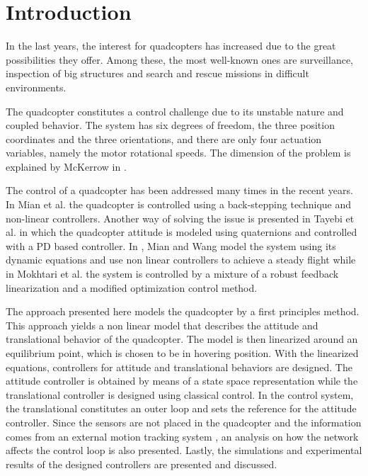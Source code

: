 \section{Introduction}
In the last years, the interest for quadcopters has increased due to the great possibilities they offer. Among these, the most well-known ones are surveillance, inspection of big structures and search and rescue missions in difficult environments. \cite{droneuses}

The quadcopter constitutes a control challenge due to its unstable nature and coupled behavior. The system has six degrees of freedom, the three position coordinates and the three orientations, and there are only four actuation variables, namely the motor rotational speeds. The dimension of the problem is explained by McKerrow in \cite{draganflyer}.

The control of a quadcopter has been addressed many times in the recent years. In Mian et al. \cite{backstepping} the quadcopter is controlled using a back-stepping technique and non-linear controllers. Another way of solving the issue is presented in Tayebi et al. \cite{quaternionsPD} in which the quadcopter attitude is modeled using quaternions and controlled with a PD based controller. In \cite{MianWang}, Mian and Wang model the system using its dynamic equations and use non linear controllers to achieve a steady flight while in Mokhtari et al. \cite{GHinf} the system is controlled by a mixture of a robust feedback linearization and a modified optimization control method.

The approach presented here models the quadcopter by a first principles method. This approach yields a non linear model that describes the attitude and translational behavior of the quadcopter. The model is then linearized around an equilibrium point, which is chosen to be in hovering position.
%
With the linearized equations, controllers for attitude and translational behaviors are designed. The attitude controller is obtained by means of a state space representation while the translational controller is designed using classical control. In the control system, the translational constitutes an outer loop and sets the reference for the attitude controller.
%
Since the sensors are not placed in the quadcopter and the information comes from an external motion tracking system \cite{vicon}, an analysis on how the network affects the control loop is also presented.
%
Lastly, the simulations and experimental results of the designed controllers are presented and discussed.